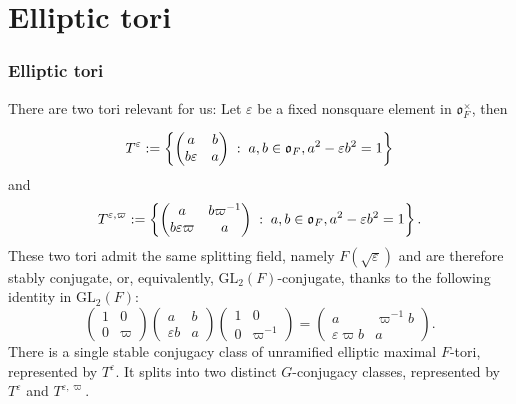 \documentclass[11pt]{amsart}
\numberwithin{equation}{section}
\def\fo{\mathfrak{o}}
\def\GL{\mathrm{GL}}
\def\fo{\mathfrak{o}}
\newcommand{\<}{\left\langle}
\renewcommand{\>}{\right\rangle}
\begin{document}
 
   
   
\section{Elliptic tori}   
\subsubsection{Elliptic tori} There are two tori relevant for us:
 Let $\varepsilon$ be a fixed nonsquare element in  $\fo_F^{\times}$, then

\begin{equation} \label{eqn:Torus-Tepsilon}
T^\varepsilon:=
\left\{\left(
\begin{matrix}
a&b\cr
b\varepsilon &a
\end{matrix}\right)\;:\; a,b\in\fo_F, a^2-\varepsilon b^2=1
\right\}
\end{equation}
and 
\begin{equation} \label{eqn:Torus-Tepsilon-varpi}
T^{\varepsilon, \varpi} :=
\left\{\left(
\begin{matrix}
a&b\varpi^{-1} \cr
b\varepsilon \varpi &a
\end{matrix}\right)\;:\; a,b\in\fo_F, a^2-\varepsilon b^2=1
\right\}.
\end{equation}
These two tori admit the same splitting field, namely $F(\sqrt \varepsilon)$ and are therefore stably conjugate, or, equivalently,
$\GL_2(F)$-conjugate,    thanks to the following identity in $\GL_2(F)$:
\begin{equation}\label{ggg}
\left(\begin{array}{cc}
1 & 0\\
0 & \varpi
\end{array}
\right)
\left(\begin{array}{cc}
a & b\\
\varepsilon b & a
\end{array}
\right)
\left(\begin{array}{cc}
1 & 0\\
0 & \varpi^{-1}
\end{array}
\right)
 = 
\left(\begin{array}{cc}
a & \varpi^{-1}b\\
\varepsilon \varpi b & a
\end{array}\right).
\end{equation}
There is a  single stable conjugacy class of unramified elliptic maximal $F$-tori,  represented by $T^\varepsilon$.   It splits into two 
distinct $G$-conjugacy classes, represented by $T^\varepsilon$ and $T^{\varepsilon, \varpi}$.   
\end{document}
